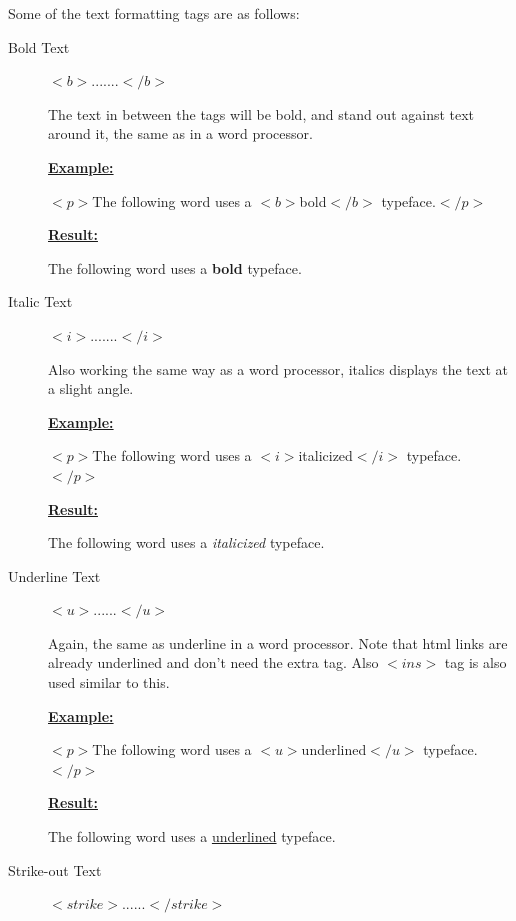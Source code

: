 \documentclass[11pt,a4paper]{article}
\begin{document}
Some of the text formatting tags are as follows:\
\begin{description}
\item[Bold Text] $<b>.......</b>$

\hspace{1cm}The text in between the tags will be bold, and stand out against text around it, the same as in a word processor.\

\underline{\textbf{Example:}}

\hspace{1cm} $<p>$The following word uses a $<b>$bold$</b>$ typeface.$</p>$

\underline{\textbf{Result:}}

\hspace{1cm} The following word uses a \textbf{bold} typeface.\

\item[Italic Text] $<i>.......</i>$

\hspace{1cm} Also working the same way as a word processor, italics displays the text at a slight angle.\

\underline{\textbf{Example:}}

\hspace{1cm}$<p>$The following word uses a $<i>$italicized$</i>$ typeface.$</p>$

\underline{\textbf{Result:}}

\hspace{1cm} The following word uses a \textit{italicized} typeface.\

\item[Underline Text] $<u>......</u>$

\hspace{1cm} Again, the same as underline in a word processor. Note that html links are already underlined and don't need the extra tag. Also $<ins>$ tag is also used similar to this.\

\underline{\textbf{Example:}}

\hspace{1cm}$<p>$The following word uses a $<u>$underlined$</u>$ typeface.$</p>$

\underline{\textbf{Result:}}

\hspace{1cm} The following word uses a \underline{underlined} typeface.\

\item[Strike-out Text] $<strike>......</strike>$


\end{description}
\end{document}
